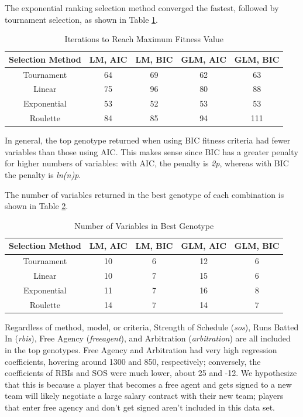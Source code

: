 \documentclass{article}
\begin{document}
The exponential ranking selection method converged the fastest, followed by tournament selection, as shown in Table \ref{table:8}.

\begin{table}[htp]
    \centering
    \caption{Iterations to Reach Maximum Fitness Value}

\begin{tabular}{ |c|c|c|c|c|  }
 \hline
 Selection Method & LM, AIC & LM, BIC & GLM, AIC & GLM, BIC\\
 \hline
 Tournament & 64  & 69 & 62  & 63\\
 Linear & 75 & 96  & 80 & 88\\
 Exponential & 53 & 52 & 53 & 53\\
 Roulette   & 84 & 85 & 94 & 111\\
 \hline
\end{tabular}

    \label{table:8}
\end{table}


In general, the top genotype returned when using BIC fitness criteria had fewer variables than those using AIC.  This makes sense since BIC has a greater penalty for higher numbers of variables:  with AIC, the penalty is \textit{2p}, whereas with BIC the penalty is \textit{ln(n)p}.


The number of variables returned in the best genotype of each combination is shown in Table \ref{table:9}.

\begin{table}[htp]
    \centering
    \caption{Number of Variables in Best Genotype}

    \begin{tabular}{ |c|c|c|c|c|  }
      \hline
      Selection Method & LM, AIC & LM, BIC & GLM, AIC & GLM, BIC\\
      \hline
      Tournament &  10   & 6 & 12  & 6\\
      Linear & 10 & 7  & 15 & 6\\
      Exponential & 11 & 7 & 16 & 8\\
      Roulette   & 14 & 7 & 14 & 7\\
    \hline
    \end{tabular}

    \label{table:9}
\end{table}

Regardless of method, model, or criteria, Strength of Schedule (\textit{sos}), Runs Batted In (\textit{rbis}), Free Agency (\textit{freeagent}), and Arbitration (\textit{arbitration}) are all included in the top genotypes.  Free Agency and Arbitration had very high regression coefficients, hovering around 1300 and 850, respectively; conversely, the coefficients of RBIs and SOS were much lower, about 25 and -12.  We hypothesize that this is because a player that becomes a free agent and gets signed to a new team will likely negotiate a large salary contract with their new team;  players that enter free agency and don't get signed aren't included in this data set.
\end{document}
